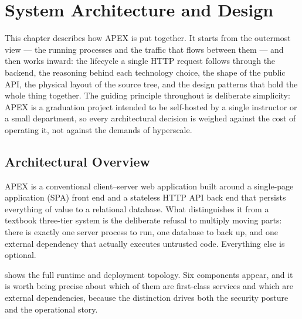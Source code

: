 \chapter{System Architecture and Design}\label{ch:ch04}

This chapter describes how APEX is put together. It starts from the outermost
view --- the running processes and the traffic that flows between them --- and
then works inward: the lifecycle a single HTTP request follows through the
backend, the reasoning behind each technology choice, the shape of the public
API, the physical layout of the source tree, and the design patterns that hold
the whole thing together. The guiding principle throughout is deliberate
simplicity: APEX is a graduation project intended to be self-hosted by a single
instructor or a small department, so every architectural decision is weighed
against the cost of operating it, not against the demands of hyperscale.

\section{Architectural Overview}\label{sec:arch-overview}

APEX is a conventional client--server web application built around a
single-page application (SPA) front end and a stateless HTTP API back end that
persists everything of value to a relational database. What distinguishes it
from a textbook three-tier system is the deliberate refusal to multiply moving
parts: there is exactly one server process to run, one database to back up, and
one external dependency that actually executes untrusted code. Everything else
is optional.

 shows the full runtime and deployment topology. Six
components appear, and it is worth being precise about which of them are
first-class services and which are external dependencies, because the
distinction drives both the security posture and the operational story.



